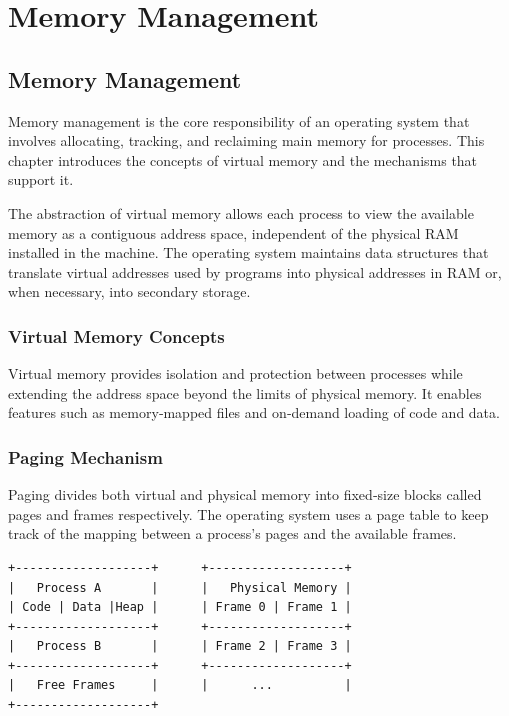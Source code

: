 \documentclass[12pt]{report}
\begin{document}
\pagestyle{plain}
\setcounter{page}{4}
\setcounter{chapter}{2}
\chapter{Memory Management}

\section{Memory Management}

Memory management is the core responsibility of an operating system that involves allocating, tracking, and reclaiming main memory for processes. This chapter introduces the concepts of virtual memory and the mechanisms that support it.

The abstraction of virtual memory allows each process to view the available memory as a contiguous address space, independent of the physical RAM installed in the machine. The operating system maintains data structures that translate virtual addresses used by programs into physical addresses in RAM or, when necessary, into secondary storage.

\subsection{Virtual Memory Concepts}
Virtual memory provides isolation and protection between processes while extending the address space beyond the limits of physical memory. It enables features such as memory‑mapped files and on‑demand loading of code and data.

\subsection{Paging Mechanism}
Paging divides both virtual and physical memory into fixed‑size blocks called pages and frames respectively. The operating system uses a page table to keep track of the mapping between a process’s pages and the available frames.

\begin{verbatim}
+-------------------+      +-------------------+
|   Process A       |      |   Physical Memory |
| Code | Data |Heap |      | Frame 0 | Frame 1 |
+-------------------+      +-------------------+
|   Process B       |      | Frame 2 | Frame 3 |
+-------------------+      +-------------------+
|   Free Frames     |      |      ...          |
+-------------------+
\end{verbatim}
\end{document}
